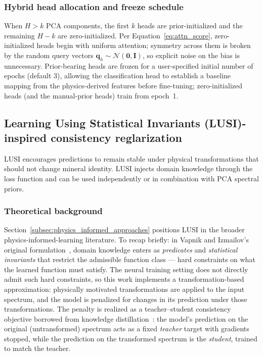 \documentclass[preprint,12pt]{elsarticle}
\begin{document}
\subsubsection{Hybrid head allocation and freeze schedule}
\label{sec:hybrid_heads}

When $H > k$ PCA components, the first $k$ heads are prior-initialized and the remaining $H - k$ are zero-initialized. Per Equation~\ref{eq:attn_score}, zero-initialized heads begin with uniform attention; symmetry across them is broken by the random query vectors $\mathbf{q}_h \sim \mathcal{N}(\mathbf{0}, \mathbf{I})$, so explicit noise on the bias is unnecessary. Prior-bearing heads are frozen for a user-specified initial number of epochs (default 3), allowing the classification head to establish a baseline mapping from the physics-derived features before fine-tuning; zero-initialized heads (and the manual-prior heads) train from epoch~1.

\subsection{Learning Using Statistical Invariants (LUSI)-inspired consistency reglarization}
\label{sec:lusi}

LUSI \cite{vapnik2020} encourages predictions to remain stable under physical transformations that should not change mineral identity.
LUSI injects domain knowledge through the loss function and can be used independently or in combination with PCA spectral priors.

\subsubsection{Theoretical background}

Section~\ref{subsec:physics_informed_approaches} positions LUSI in the broader physics-informed-learning literature. To recap briefly: in Vapnik and Izmailov's original formulation~\cite{vapnik2020}, domain knowledge enters as \emph{predicates} and \emph{statistical invariants} that restrict the admissible function class --- hard constraints on what the learned function must satisfy. The neural training setting does not directly admit such hard constraints, so this work implements a transformation-based approximation: physically motivated transformations are applied to the input spectrum, and the model is penalized for changes in its prediction under those transformations. The penalty is realized as a teacher--student consistency objective borrowed from knowledge distillation~\cite{hinton2015distilling}: the model's prediction on the original (untransformed) spectrum acts as a fixed \emph{teacher} target with gradients stopped, while the prediction on the transformed spectrum is the \emph{student}, trained to match the teacher.
\end{document}
